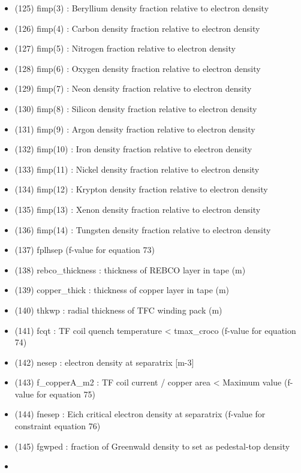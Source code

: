 \documentclass[
]{article}
\begin{document}
\begin{itemize}
\begin{itemize}
  \item
    (125) fimp(3) : Beryllium density fraction relative to electron
    density
  \item
    (126) fimp(4) : Carbon density fraction relative to electron density
  \item
    (127) fimp(5) : Nitrogen fraction relative to electron density
  \item
    (128) fimp(6) : Oxygen density fraction relative to electron density
  \item
    (129) fimp(7) : Neon density fraction relative to electron density
  \item
    (130) fimp(8) : Silicon density fraction relative to electron
    density
  \item
    (131) fimp(9) : Argon density fraction relative to electron density
  \item
    (132) fimp(10) : Iron density fraction relative to electron density
  \item
    (133) fimp(11) : Nickel density fraction relative to electron
    density
  \item
    (134) fimp(12) : Krypton density fraction relative to electron
    density
  \item
    (135) fimp(13) : Xenon density fraction relative to electron density
  \item
    (136) fimp(14) : Tungsten density fraction relative to electron
    density
  \item
    (137) fplhsep (f-value for equation 73)
  \item
    (138) rebco\_thickness : thickness of REBCO layer in tape (m)
  \item
    (139) copper\_thick : thickness of copper layer in tape (m)
  \item
    (140) thkwp : radial thickness of TFC winding pack (m)
  \item
    (141) fcqt : TF coil quench temperature \textless{} tmax\_croco
    (f-value for equation 74)
  \item
    (142) nesep : electron density at separatrix {[}m-3{]}
  \item
    (143) f\_copperA\_m2 : TF coil current / copper area \textless{}
    Maximum value (f-value for equation 75)
  \item
    (144) fnesep : Eich critical electron density at separatrix (f-value
    for constraint equation 76)
  \item
    (145) fgwped : fraction of Greenwald density to set as pedestal-top
    density
  \item

\end{itemize}
\end{itemize}
\end{document}
